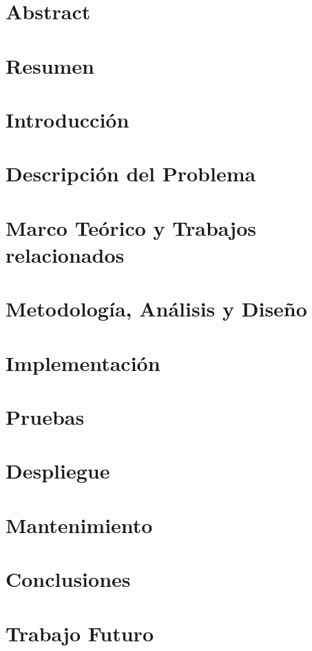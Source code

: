 \documentclass[11pt,twoside]{thesis}
\begin{document}
\chapter*{Abstract} 
\chapter*{Resumen} 
\setcounter{tocdepth}{5}
\tableofcontents
 \listoffigures
 \listoftables

\dominitoc
\cleardoublepage
\chapter{Introducci\'on}


\chapter{Descripci\'on del Problema}


\chapter{Marco Te\'orico y Trabajos relacionados}


\chapter{Metodolog\'ia, An\'alisis y Dise\~no}


\chapter{Implementaci\'on}


\chapter{Pruebas}


\chapter{Despliegue}


\chapter{Mantenimiento}


\chapter{Conclusiones}


\chapter{Trabajo Futuro}



\end{document}
